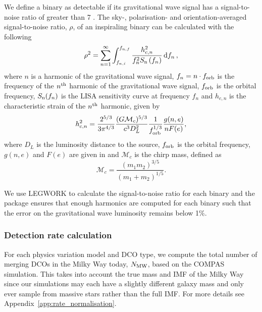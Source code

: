 We define a binary as detectable if its gravitational wave signal has a signal-to-noise ratio of greater than 7 \citep[e.g.][]{Breivik+2020, Korol+2020}. The sky-, polarisation- and orientation-averaged signal-to-noise ratio, $\rho$, of an inspiraling binary can be calculated with the following \citep[e.g.][]{Finn+2000}
\begin{equation}\label{eq:snr}
    \rho^2 = \sum_{n=1}^{\infty} \int_{f_{n, i}}^{f_{n, f}} \frac{h_{c, n}^{2}}{f_{n}^{2} S_{\rm n}\left(f_{n}\right)} \dd{f_n},
\end{equation}
where $n$ is a harmonic of the gravitational wave signal, $f_n = n \cdot f_{\rm orb}$ is the frequency of the $n^{\rm th}$ harmonic of the gravitational wave signal, $f_{\rm orb}$ is the orbital frequency, $S_{\rm n}(f_n)$ is the LISA sensitivity curve at frequency $f_n$ \citep[e.g.][]{Robson+2019} and $h_{c,n}$ is the characteristic strain of the $n^{\rm th}$ harmonic, given by \citep[e.g.][]{Barack+2004}
\begin{equation}\label{eq:charstrain}
    h^2_{c,n} = \frac{2^{5/3}}{3 \pi^{4/3}} \frac{(G \mathcal{M}_c)^{5/3}}{c^3 D_L^2} \frac{1}{f_{\rm orb}^{1/3}} \frac{g(n,e)}{n F(e)},
\end{equation}
where $D_L$ is the luminosity distance to the source, $f_{\rm orb}$ is the orbital frequency, $g(n, e)$ and $F(e)$ are given in \citet{Peters+1963} and $\mathcal{M}_c$ is the chirp mass, defined as
\begin{equation}\label{eq:chirp_mass}
    \mathcal{M}_c = \frac{(m_1 m_2)^{3/5}}{(m_1 + m_2)^{1/5}}.
\end{equation}

We use LEGWORK to calculate the signal-to-noise ratio for each binary and the package ensures that enough harmonics are computed for each binary such that the error on the gravitational wave luminosity remains below 1\%.

\subsubsection{Detection rate calculation}
For each physics variation model and DCO type, we compute the total number of merging DCOs in the Milky Way today, $N_{\rm MW}$, based on the COMPAS simulation. This takes into account the true mass and IMF of the Milky Way since our simulations may each have a slightly different galaxy mass and only ever sample from massive stars rather than the full IMF. For more details see Appendix~\ref{app:rate_normalisation}.

